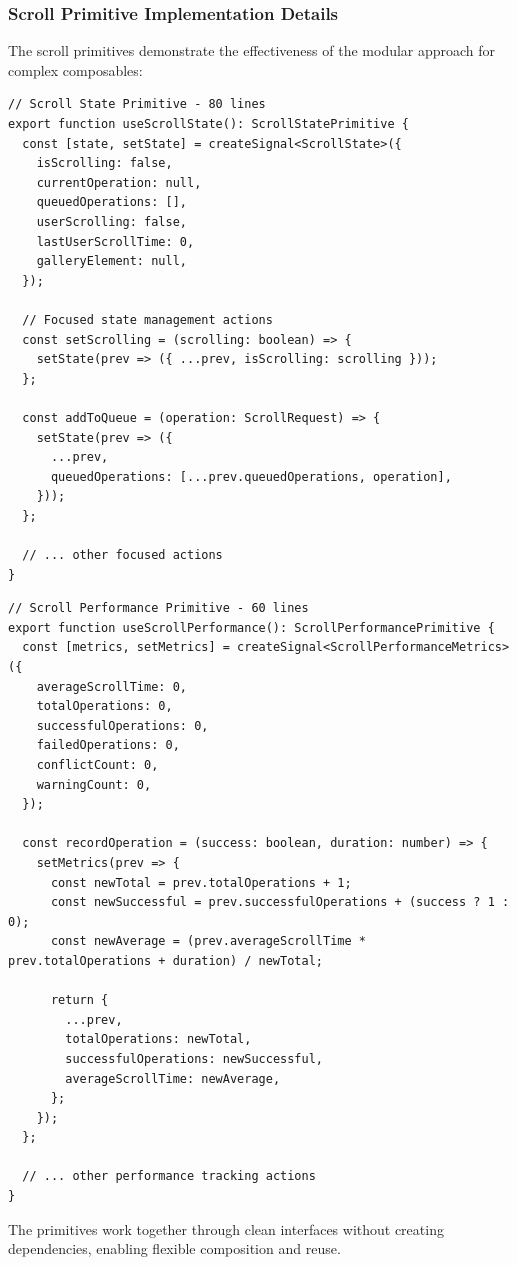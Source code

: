 \documentclass[11pt]{article}
\begin{document}
\subsubsection{Scroll Primitive Implementation Details}

The scroll primitives demonstrate the effectiveness of the modular approach for complex composables:

\begin{lstlisting}[style=typescript]
// Scroll State Primitive - 80 lines
export function useScrollState(): ScrollStatePrimitive {
  const [state, setState] = createSignal<ScrollState>({
    isScrolling: false,
    currentOperation: null,
    queuedOperations: [],
    userScrolling: false,
    lastUserScrollTime: 0,
    galleryElement: null,
  });

  // Focused state management actions
  const setScrolling = (scrolling: boolean) => {
    setState(prev => ({ ...prev, isScrolling: scrolling }));
  };

  const addToQueue = (operation: ScrollRequest) => {
    setState(prev => ({
      ...prev,
      queuedOperations: [...prev.queuedOperations, operation],
    }));
  };

  // ... other focused actions
}
\end{lstlisting}

\begin{lstlisting}[style=typescript]
// Scroll Performance Primitive - 60 lines
export function useScrollPerformance(): ScrollPerformancePrimitive {
  const [metrics, setMetrics] = createSignal<ScrollPerformanceMetrics>({
    averageScrollTime: 0,
    totalOperations: 0,
    successfulOperations: 0,
    failedOperations: 0,
    conflictCount: 0,
    warningCount: 0,
  });

  const recordOperation = (success: boolean, duration: number) => {
    setMetrics(prev => {
      const newTotal = prev.totalOperations + 1;
      const newSuccessful = prev.successfulOperations + (success ? 1 : 0);
      const newAverage = (prev.averageScrollTime * prev.totalOperations + duration) / newTotal;

      return {
        ...prev,
        totalOperations: newTotal,
        successfulOperations: newSuccessful,
        averageScrollTime: newAverage,
      };
    });
  };

  // ... other performance tracking actions
}
\end{lstlisting}

The primitives work together through clean interfaces without creating dependencies, enabling flexible composition and reuse.
\end{document}
